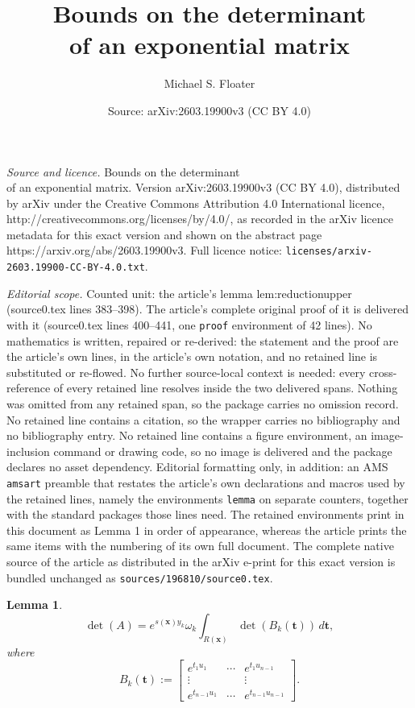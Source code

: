 \documentclass[10pt,a4paper]{amsart}
\title{Bounds on the determinant \\ of an exponential matrix}
\author{Michael S. Floater}
\date{Source: arXiv:2603.19900v3 (CC BY 4.0)}
\newtheorem{lemma}{Lemma}
\def\bft{\mathbf{t}}
\def\bfx{\mathbf{x}}
\begin{document}
\maketitle

\noindent\emph{Source and licence.} Bounds on the determinant \\ of an exponential matrix. Version arXiv:2603.19900v3 (CC BY 4.0), distributed by arXiv under the Creative Commons Attribution 4.0 International licence, http://creativecommons.org/licenses/by/4.0/, as recorded in the arXiv licence metadata for this exact version and shown on the abstract page https://arxiv.org/abs/2603.19900v3. Full licence notice: \texttt{licenses/arxiv-2603.19900-CC-BY-4.0.txt}.\par\smallskip

\noindent\textit{Editorial scope.} Counted unit: the article's lemma lem:reductionupper (source0.tex lines 383--398). The article's complete original proof of it is delivered with it (source0.tex lines 400--441, one \texttt{proof} environment of 42 lines). No mathematics is written, repaired or re-derived: the statement and the proof are the article's own lines, in the article's own notation, and no retained line is substituted or re-flowed.  No further source-local context is needed: every cross-reference of every retained line resolves inside the two delivered spans.  Nothing was omitted from any retained span, so the package carries no omission record.  No retained line contains a citation, so the wrapper carries no bibliography and no bibliography entry.  No retained line contains a figure environment, an image-inclusion command or drawing code, so no image is delivered and the package declares no asset dependency.  Editorial formatting only, in addition: an AMS \texttt{amsart} preamble that restates the article's own declarations and macros used by the retained lines, namely the environments \texttt{lemma} on separate counters, together with the standard packages those lines need.  The retained environments print in this document as Lemma 1 in order of appearance, whereas the article prints the same items with the numbering of its own full document.  The complete native source of the article as distributed in the arXiv e-print for this exact version is bundled unchanged as \texttt{sources/196810/source0.tex}.
\begin{lemma}\label{lem:reductionupper}
$$
\det(A) = e^{s(\bfx)y_k} \omega_k
 \int_{R(\bfx)} \det(B_k(\bft)) \, d \bft,
$$
where
$$
B_k(\bft) := \left[
\begin{matrix}
e^{t_1 u_1} & \cdots & e^{t_1 u_{n-1}} \\
\vdots & & \vdots \\
e^{t_{n-1} u_1} & \cdots & e^{t_{n-1} u_{n-1}}
\end{matrix}
\right].
$$
\end{lemma}
\end{document}
